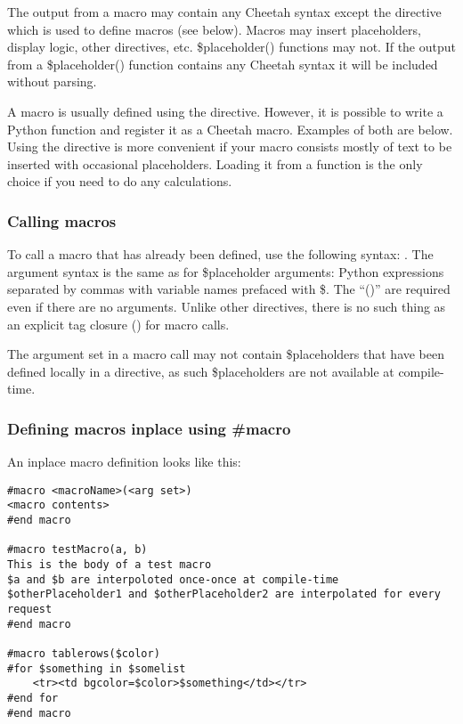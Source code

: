The output from a macro may contain any Cheetah syntax except the 
directive which is used to define macros (see below).  Macros may insert
placeholders, display logic, other directives, etc.  \$placeholder() functions
may not.  If the output from a \$placeholder() function contains any Cheetah
syntax it will be included without parsing.

A macro is usually defined using the  directive.  However, it is
possible to write a Python function and register it as a Cheetah macro.
Examples of both are below.  Using the  directive is more
convenient if your macro consists mostly of text to be inserted with occasional
placeholders.  Loading it from a function is the only choice if you need to do
any calculations.


\subsubsection{Calling macros}
\label{directives.macros.calling}

To call a macro that has already been defined, use the following syntax:
.  The argument syntax is the same as for
\$placeholder arguments: Python expressions separated by commas with variable
names prefaced with \$.  The ``()'' are required even if there are no arguments.
Unlike other directives, there is no such thing as an explicit tag closure
(\code{\/\#}) for macro calls.

The argument set in a macro call may not contain \$placeholders that have been
defined locally in a  directive, as such \$placeholders are not
available at compile-time.


\subsubsection{Defining macros inplace using \#macro}
\label{directives.macros.defining}

An inplace macro definition looks like this:

\begin{verbatim}
#macro <macroName>(<arg set>)
<macro contents>
#end macro

#macro testMacro(a, b)
This is the body of a test macro
$a and $b are interpoloted once-once at compile-time
$otherPlaceholder1 and $otherPlaceholder2 are interpolated for every request
#end macro

#macro tablerows($color)
#for $something in $somelist
    <tr><td bgcolor=$color>$something</td></tr>
#end for
#end macro
\end{verbatim}

